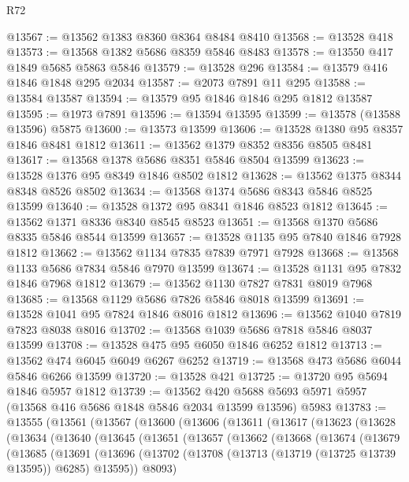 \begin{lexlean}{R72}
\begin{coremodule}
@13567 := @13562 @1383 @8360 @8364 @8484 @8410
@13568 := @13528 @418
@13573 := @13568 @1382 @5686 @8359 @5846 @8483
@13578 := @13550 @417 @1849 @5685 @5863 @5846
@13579 := @13528 @296
@13584 := @13579 @416 @1846 @1848 @295 @2034
@13587 := @2073 @7891 @11 @295
@13588 := @13584 @13587
@13594 := @13579 @95 @1846 @1846 @295 @1812 @13587
@13595 := @1973 @7891
@13596 := @13594 @13595
@13599 := @13578 (@13588 @13596) @5875
@13600 := @13573 @13599
@13606 := @13528 @1380 @95 @8357 @1846 @8481 @1812
@13611 := @13562 @1379 @8352 @8356 @8505 @8481
@13617 := @13568 @1378 @5686 @8351 @5846 @8504 @13599
@13623 := @13528 @1376 @95 @8349 @1846 @8502 @1812
@13628 := @13562 @1375 @8344 @8348 @8526 @8502
@13634 := @13568 @1374 @5686 @8343 @5846 @8525 @13599
@13640 := @13528 @1372 @95 @8341 @1846 @8523 @1812
@13645 := @13562 @1371 @8336 @8340 @8545 @8523
@13651 := @13568 @1370 @5686 @8335 @5846 @8544 @13599
@13657 := @13528 @1135 @95 @7840 @1846 @7928 @1812
@13662 := @13562 @1134 @7835 @7839 @7971 @7928
@13668 := @13568 @1133 @5686 @7834 @5846 @7970 @13599
@13674 := @13528 @1131 @95 @7832 @1846 @7968 @1812
@13679 := @13562 @1130 @7827 @7831 @8019 @7968
@13685 := @13568 @1129 @5686 @7826 @5846 @8018 @13599
@13691 := @13528 @1041 @95 @7824 @1846 @8016 @1812
@13696 := @13562 @1040 @7819 @7823 @8038 @8016
@13702 := @13568 @1039 @5686 @7818 @5846 @8037 @13599
@13708 := @13528 @475 @95 @6050 @1846 @6252 @1812
@13713 := @13562 @474 @6045 @6049 @6267 @6252
@13719 := @13568 @473 @5686 @6044 @5846 @6266 @13599
@13720 := @13528 @421
@13725 := @13720 @95 @5694 @1846 @5957 @1812
@13739 := @13562
    @420
    @5688
    @5693
    @5971
    @5957
    (@13568 @416 @5686 @1848 @5846 @2034 @13599 @13596)
    @5983
@13783 := @13555
    (@13561
      (@13567
        (@13600
          (@13606
            (@13611
              (@13617
                (@13623
                  (@13628
                    (@13634
                      (@13640
                        (@13645
                          (@13651
                            (@13657
                              (@13662
                                (@13668
                                  (@13674
                                    (@13679
                                      (@13685
                                        (@13691
                                          (@13696
                                            (@13702
                                              (@13708
                                                (@13713 (@13719 (@13725 @13739 @13595)) @6285)
                                                @13595))
                                            @8093)

\end{coremodule}
\end{lexlean}
